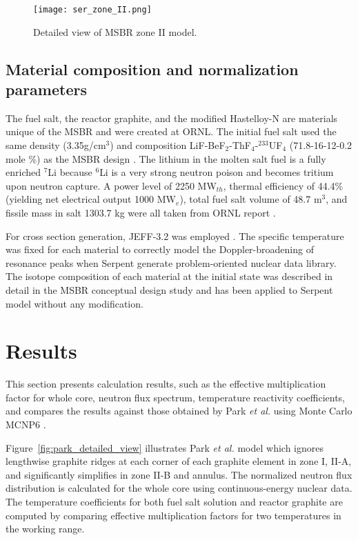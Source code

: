 \begin{figure}[hbp!] %
  \centering
  \vspace{-0.3em}
  \texttt{[image: ser\_zone\_II.png]}
  \caption{Detailed view of \gls{MSBR} zone II model.}
  \vspace{-0.6em}
  \label{fig:serpent_zoneII}
\end{figure}
\FloatBarrier

\subsection{Material composition and normalization parameters}
The fuel salt, the reactor graphite, and the modified Hastelloy-N are materials 
unique of the \gls{MSBR} and were created at \gls{ORNL}. The initial fuel salt used the same density (3.35g/cm$^3$) and composition LiF-BeF$_2$-ThF$_4$-$^{233}$UF$_4$ (71.8-16-12-0.2 mole \%) as the \gls{MSBR} design \cite{robertson_conceptual_1971}. The lithium in the molten salt fuel is a fully enriched $^{7}$Li because 
$^{6}$Li is a very strong neutron poison and becomes tritium upon neutron 
capture. A power level of 2250 MW$_{th}$, thermal efficiency of 44.4\% (yielding net electrical output 1000 MW$_e$), total fuel salt volume of 48.7 m$^3$, and fissile mass in salt 1303.7 kg were all taken from ORNL report \cite{robertson_conceptual_1971}.

For cross section generation, JEFF-3.2 was employed 
\cite{oecd/nea_data_bank_jeff-3.2_2014}. The specific temperature was fixed for each 
material to correctly model the Doppler-broadening of resonance peaks when 
Serpent generate problem-oriented nuclear data library. The isotope composition of each material at the initial state was described in detail in the MSBR conceptual design study \cite{robertson_conceptual_1971} and has been applied to Serpent model without any modification. 

\section{Results}
This section presents calculation results, such as the effective multiplication 
factor for whole core, neutron flux spectrum, temperature reactivity 
coefficients, and compares the results against those obtained by Park \emph{et al.} using Monte Carlo \gls{MCNP}6 \cite{park_whole_2015}. 

Figure~\ref{fig:park_detailed_view} illustrates Park \emph{et al.} model which ignores lengthwise graphite ridges at each corner of each graphite element in zone I, II-A, and significantly simplifies in zone II-B and annulus. The normalized neutron flux distribution is calculated for the whole core using continuous-energy nuclear data. The temperature coefficients for both fuel salt solution and reactor graphite are computed by comparing effective multiplication factors for two temperatures in the working range.

